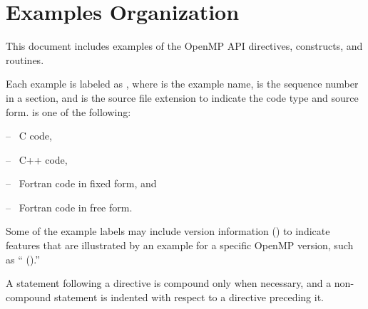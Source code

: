 \section{Examples Organization}
\label{chap:examples}
\label{sec:examples}

This document includes examples of the OpenMP API directives, constructs, and routines.

Each example is labeled as , where  is 
the example name,  is the sequence number in a section, and 
 is the source file extension to indicate the code type and 
source form.   is one of the following:
\begin{description}[noitemsep,labelindent=5mm,widest=f90]
\item[\plc{c}] -- \ C code,
\item[\plc{cpp}] -- \ C++ code,
\item[\plc{f}] -- \ Fortran code in fixed form, and
\item[\plc{f90}] -- \ Fortran code in free form.
\end{description}

Some of the example labels may include version information 
() to indicate features that are illustrated
by an example for a specific OpenMP version, such as `` 
\;().''

\ccppspecificstart
A statement following a directive is compound only when necessary, and a 
non-compound statement is indented with respect to a directive preceding it.
\ccppspecificend
